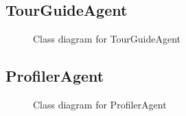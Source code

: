 \documentclass[paper=letter, fontsize=12pt]{article}
\begin{document}
\subsection{TourGuideAgent}

\begin{figure}[H]
  \begin{center}
    \caption{Class diagram for TourGuideAgent}
    \label{fig:tourguide_class}
  \end{center}
\end{figure}

\subsection{ProfilerAgent}
\begin{figure}[H]
  \begin{center}
    \caption{Class diagram for ProfilerAgent}
    \label{fig:profiler_class}
  \end{center}
\end{figure}
\end{document}
